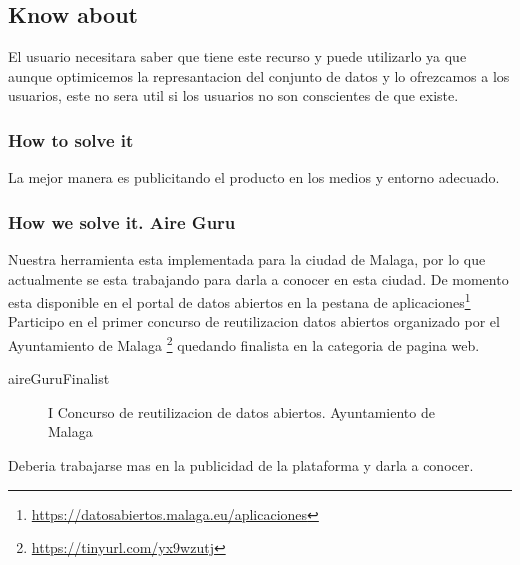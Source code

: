 \subsection{Know about}

El usuario necesitara saber que tiene este recurso y puede utilizarlo ya que aunque optimicemos la represantacion del 
conjunto de datos y lo ofrezcamos a los usuarios, este no sera util si los usuarios no son conscientes de que existe.
\subsubsection{How to solve it} 
La mejor manera es publicitando el producto en los medios y entorno adecuado.
\subsubsection{How we solve it. Aire Guru} 
Nuestra herramienta esta implementada para la ciudad de Malaga, por lo que actualmente se esta trabajando para darla a 
conocer en esta ciudad.
De momento esta disponible en el portal de datos abiertos en la pestana de aplicaciones\footnote{\url{https://datosabiertos.malaga.eu/aplicaciones}}\\
Participo en el primer concurso de reutilizacion datos abiertos organizado por el Ayuntamiento de Malaga \footnote{\url{https://tinyurl.com/yx9wzutj}}
quedando finalista en la categoria de pagina web.

aireGuruFinalist

\begin{figure}[ht]
    \centering
   \hfill
 
    \caption{I Concurso de reutilizacion de datos abiertos. Ayuntamiento de Malaga}
    \end{figure}

\begin{itemize}
\crossed Deberia trabajarse mas en la publicidad de la plataforma y darla a conocer.  
\end{itemize}
\newpage